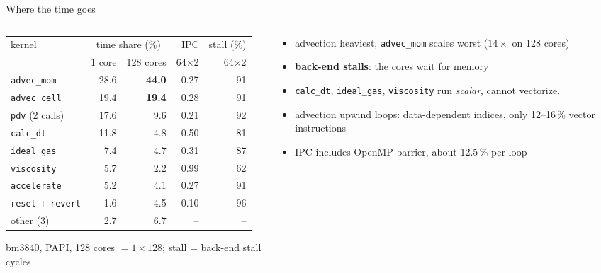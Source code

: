 \documentclass[aspectratio=169,10pt]{beamer}
\newcommand{\kernel}[1]{\texttt{#1}}
\newcommand{\good}[1]{\textcolor{rugred}{\textbf{#1}}}
\begin{document}
\begin{frame}{Where the time goes}
  \begin{columns}[T]
    \begin{column}{0.57\textwidth}
      \footnotesize
      \begin{tabular}{lrrrr}
        \toprule
        kernel & \multicolumn{2}{c}{time share (\%)} & IPC & stall (\%) \\
               & 1 core & 128 cores & 64$\times$2 & 64$\times$2 \\
        \midrule
        \kernel{advec\_mom}  & 28.6 & \good{44.0} & 0.27 & 91 \\
        \kernel{advec\_cell} & 19.4 & \good{19.4} & 0.28 & 91 \\
        \kernel{pdv} (2 calls) & 17.6 &  9.6 & 0.21 & 92 \\
        \kernel{calc\_dt}    & 11.8 &  4.8 & 0.50 & 81 \\
        \kernel{ideal\_gas}  &  7.4 &  4.7 & 0.31 & 87 \\
        \kernel{viscosity}   &  5.7 &  2.2 & 0.99 & 62 \\
        \kernel{accelerate}  &  5.2 &  4.1 & 0.27 & 91 \\
        \kernel{reset} + \kernel{revert} & 1.6 & 4.5 & 0.10 & 96 \\
        other (3)            &  2.7 &  6.7 & -- & -- \\
        \bottomrule
      \end{tabular}
      \vspace{0.2cm}

      \scriptsize bm3840, PAPI, 128 cores $=1\times128$; stall = back-end stall cycles
    \end{column}
    \begin{column}{0.43\textwidth}
      \begin{itemize}
        \item advection heaviest, \kernel{advec\_mom} scales worst ($14\times$ on 128 cores)
        \item \textbf{back-end stalls}: the cores wait for memory
        \item \kernel{calc\_dt}, \kernel{ideal\_gas}, \kernel{viscosity} run \emph{scalar}, cannot vectorize.
        \item advection upwind loops: data-dependent indices, only 12--16\,\% vector instructions
        \item IPC includes OpenMP barrier, about 12.5\,\% per loop
      \end{itemize}
    \end{column}
  \end{columns}
\end{frame}
\end{document}
